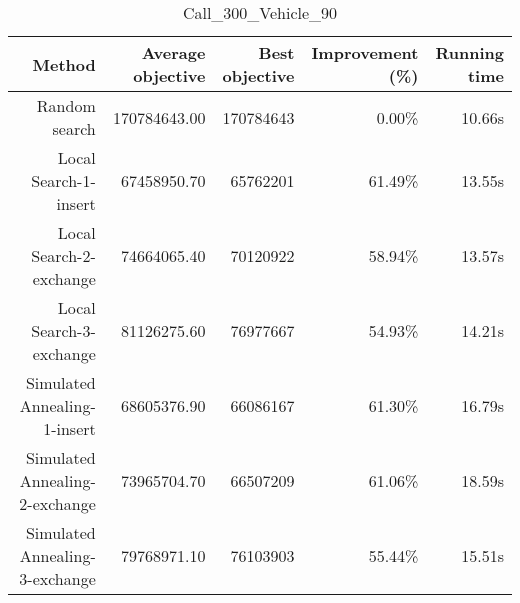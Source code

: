 \begin{table}[ht]
\centering
\caption{Call\_300\_Vehicle\_90}
\label{tab:call300vehicle90}
\begin{tabular}{|r|r|r|r|r|}
Method & Average objective & Best objective & Improvement (\%) & Running time \\
\hline
Random search & 170784643.00 & 170784643 & 0.00\% & 10.66s\\
Local Search-1-insert & 67458950.70 & 65762201 & 61.49\% & 13.55s\\
Local Search-2-exchange & 74664065.40 & 70120922 & 58.94\% & 13.57s\\
Local Search-3-exchange & 81126275.60 & 76977667 & 54.93\% & 14.21s\\
Simulated Annealing-1-insert & 68605376.90 & 66086167 & 61.30\% & 16.79s\\
Simulated Annealing-2-exchange & 73965704.70 & 66507209 & 61.06\% & 18.59s\\
Simulated Annealing-3-exchange & 79768971.10 & 76103903 & 55.44\% & 15.51s\\
\end{tabular}%
\end{table}
